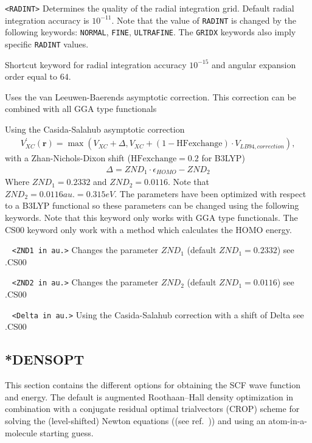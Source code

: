 \begin{description}
\verb|<RADINT>|\newline
Determines the quality of the radial integration grid. Default radial integration accuracy is $10^{-11}$.
Note that the value of \verb|RADINT| is changed by the following keywords:
\verb|NORMAL|, \verb|FINE|, \verb|ULTRAFINE|.
The \verb|GRIDX| keywords also imply specific \verb|RADINT| values.
\item[\Key{ULTRAF}]
Shortcut keyword for radial integration accuracy $10^{-15}$ and angular expansion order equal to $64$.
\item[\Key{LB94}] Uses the van Leeuwen-Baerends asymptotic correction. This correction can be combined with all GGA type functionals
\item[\Key{CS00}] Using the Casida-Salahub asymptotic correction\cite{dixon,CasidaSalahub} 
\begin{eqnarray}
V^{\prime}_{XC}(\textbf{r}) = \max \left(V_{XC} + \Delta , V_{XC} + (1-\mathrm{HFexchange}) \cdot V_{LB94,correction}\right),  
\end{eqnarray}
with a Zhan-Nichols-Dixon shift \cite{dixon,ZND} ($\mathrm{HFexchange}=0.2$ for B3LYP)
\begin{eqnarray}
\Delta = ZND_{1} \cdot \epsilon_{HOMO} - ZND_{2}
\end{eqnarray}
Where $ZND_{1} = 0.2332$ and $ZND_{2} = 0.0116$. Note that $ZND_{2} = 0.0116 au. = 0.315 eV$.
The parameters have been optimized with respect to a B3LYP functional so these parameters can be changed using the following keywords. Note that this keyword only works with GGA type functionals. The CS00 keyword only work with a method which calculates the HOMO energy. 
\item[\Key{CS00 ZND1}] \verb| | \newline
\verb|<ZND1 in au.>|\newline
Changes the parameter $ZND_{1}$ (default $ZND_{1} = 0.2332$) see .CS00
\item[\Key{CS00 ZND1}] \verb| | \newline
\verb|<ZND2 in au.>|\newline
Changes the parameter $ZND_{2}$ (default $ZND_{1} = 0.0116$) see .CS00
\item[\Key{CS00 SHIFT}] \verb| | \newline
\verb|<Delta in au.>|\newline
Using the Casida-Salahub correction with a shift of Delta see .CS00
\end{description}

\subsection{*DENSOPT}\label{subsec:densopt}
This section contains the different options for obtaining the SCF wave function
and energy. The default is augmented Roothaan--Hall density optimization  in combination with
a conjugate residual optimal trialvectors (CROP) scheme for solving the (level-shifted) Newton equations ((see ref.~\cite{crop})) and using an
atom-in-a-molecule  starting guess. 


